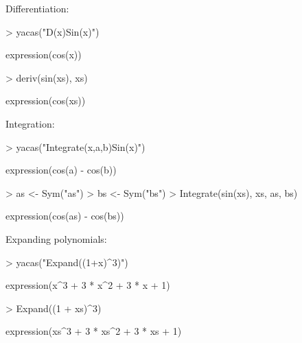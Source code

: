 \documentclass[]{article}
\begin{document}
Differentiation:
\begin{Schunk}
\begin{Sinput}
> yacas("D(x)Sin(x)")
\end{Sinput}
\begin{Soutput}
expression(cos(x))
\end{Soutput}
\end{Schunk}
\begin{Schunk}
\begin{Sinput}
> deriv(sin(xs), xs)
\end{Sinput}
\begin{Soutput}
expression(cos(xs))
\end{Soutput}
\end{Schunk}

Integration: 

\begin{Schunk}
\begin{Sinput}
> yacas("Integrate(x,a,b)Sin(x)")
\end{Sinput}
\begin{Soutput}
expression(cos(a) - cos(b))
\end{Soutput}
\end{Schunk}

\begin{Schunk}
\begin{Sinput}
> as <- Sym("as")
> bs <- Sym("bs")
> Integrate(sin(xs), xs, as, bs)
\end{Sinput}
\begin{Soutput}
expression(cos(as) - cos(bs))
\end{Soutput}
\end{Schunk}


Expanding polynomials:
\begin{Schunk}
\begin{Sinput}
> yacas("Expand((1+x)^3)")
\end{Sinput}
\begin{Soutput}
expression(x^3 + 3 * x^2 + 3 * x + 1)
\end{Soutput}
\end{Schunk}

\begin{Schunk}
\begin{Sinput}
> Expand((1 + xs)^3)
\end{Sinput}
\begin{Soutput}
expression(xs^3 + 3 * xs^2 + 3 * xs + 1)
\end{Soutput}
\end{Schunk}
\end{document}
